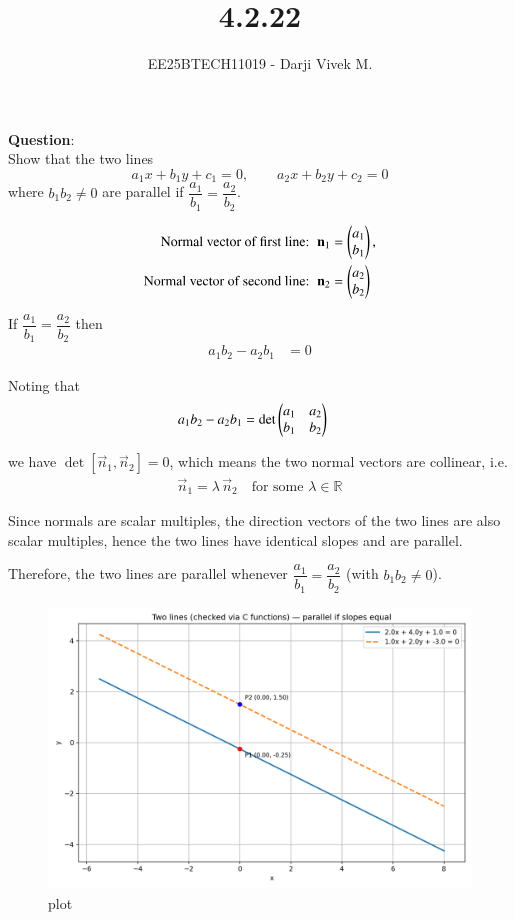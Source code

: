 \documentclass[journal]{IEEEtran}
\begin{document}


\title{4.2.22}
\author{EE25BTECH11019 - Darji Vivek M.}
{\let\newpage\relax\maketitle}

\renewcommand{\thefigure}{\theenumi}
\renewcommand{\thetable}{\theenumi}
\setlength{\intextsep}{10pt}
\renewcommand{\thetable}{\theenumi}
\textbf{Question}:\\
Show that the two lines
\[
a_1 x + b_1 y + c_1 = 0,\qquad a_2 x + b_2 y + c_2 = 0
\]
where $b_1 b_2 \neq 0$ are parallel if $\dfrac{a_1}{b_1}=\dfrac{a_2}{b_2}$.
\\
\solution

\begin{align}
\text{Normal vector of first line: }\ &\mathbf{n}_1=\begin{pmatrix}a_1\\b_1\end{pmatrix}, \\
\text{Normal vector of second line: }\ &\mathbf{n}_2=\begin{pmatrix}a_2\\b_2\end{pmatrix}
\end{align}

If \(\dfrac{a_1}{b_1}=\dfrac{a_2}{b_2}\) then
\begin{align}
a_1 b_2 - a_2 b_1 &= 0
\end{align}

Noting that
\begin{align}
a_1 b_2 - a_2 b_1 &= \det\begin{pmatrix}a_1 & a_2 \\ b_1 & b_2\end{pmatrix}
\end{align}

we have \(\det\! [\vec{n}_1,\vec{n}_2]=0\), which means the two normal vectors are collinear, i.e.
\begin{align}
\vec{n}_1 = \lambda\,\vec{n}_2 \quad\text{for some }\lambda\in\mathbb{R}
\end{align}

Since normals are scalar multiples, the direction vectors of the two lines are also scalar multiples, hence the two lines have identical slopes and are parallel.

Therefore, the two lines are parallel whenever \(\dfrac{a_1}{b_1}=\dfrac{a_2}{b_2}\) (with \(b_1 b_2\neq0\)).

\begin{figure}[H]
\centering
\includegraphics[width=0.75\columnwidth]{figs/5.png}
\caption{\centering plot}
\label{fig:placeholder_125}
\end{figure}
\end{document}
